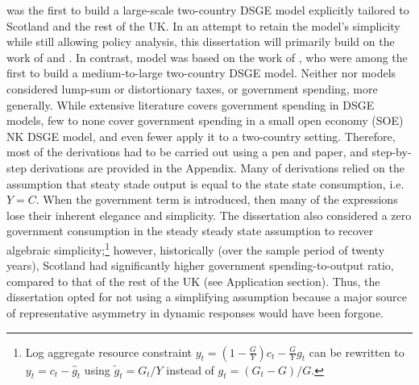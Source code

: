 \textcite{ricci_2019_essays} was the first to build a large-scale two-country DSGE model explicitly tailored to Scotland and the rest of the UK. In an attempt to retain the model's simplicity while still allowing policy analysis, this dissertation will primarily build on the work of \textcite{gali_2005_monetary} and \textcite{jordigal_2015_monetary}. In contrast, \textcite{ricci_2019_essays} model was based on the work of \textcite{rabanal_2010_eurodollar}, who were among the first to build a medium-to-large two-country DSGE model. Neither \textcite{gali_2005_monetary} nor \textcite{jordigal_2015_monetary} models considered lump-sum or distortionary taxes, or government spending, more generally. While extensive literature covers government spending in DSGE models, few to none cover government spending in a small open economy (SOE) NK DSGE model, and even fewer apply it to a two-country setting. Therefore, most of the derivations had to be carried out using a pen and paper, and step-by-step derivations are provided in the Appendix. Many of \citereset\textcite{jordigal_2015_monetary} derivations relied on the assumption that steaty stade output is equal to the state state consumption, i.e. $Y=C$. When the government term is introduced, then many of the expressions lose their inherent elegance and simplicity. The dissertation also considered a zero government consumption in the steady steady state assumption to recover algebraic simplicity;\enlargethispage{\baselineskip}\footnote{Log aggregate resource constraint $y_t = \left( 1 - \frac{G}{Y}\right)c_t - \frac{G}{Y}g_t$ can be rewritten to $y_t = c_t - \hat{g}_t$ using $\tilde{g}_t = G_t/Y$ instead of $g_t = (G_t - G)/G$.} however, historically (over the sample period of twenty years), Scotland had significantly higher government spending-to-output ratio, compared to that of the rest of the UK (see Application section). Thus, the dissertation opted for not using a simplifying assumption because a major source of representative asymmetry in dynamic responses would have been forgone.

